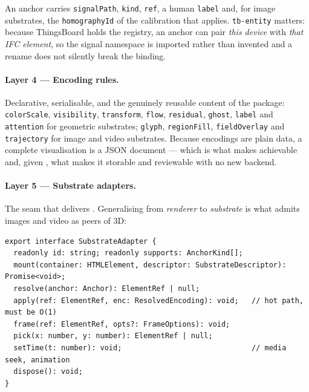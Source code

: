 An anchor carries \texttt{signalPath}, \texttt{kind}, \texttt{ref}, a human
\texttt{label} and, for image substrates, the \texttt{homographyId} of the calibration
that applies. \texttt{tb-entity} matters: because ThingsBoard holds the registry, an
anchor can pair \emph{this device} with \emph{that IFC element}, so the signal namespace
is imported rather than invented and a rename does not silently break the binding.

\paragraph{Layer 4 --- Encoding rules.} Declarative, serialisable, and the genuinely
reusable content of the package: \texttt{colorScale}, \texttt{visibility},
\texttt{transform}, \texttt{flow}, \texttt{residual}, \texttt{ghost}, \texttt{label} and
\texttt{attention} for geometric substrates; \texttt{glyph}, \texttt{regionFill},
\texttt{fieldOverlay} and \texttt{trajectory} for image and video substrates. Because
encodings are plain data, a complete visualisation is a JSON document --- which is what
makes  achievable and, given , what makes it storable and
reviewable with no new backend.

\paragraph{Layer 5 --- Substrate adapters.} The seam that delivers . Generalising
from \emph{renderer} to \emph{substrate} is what admits images and video as peers of 3D:

\begin{lstlisting}
export interface SubstrateAdapter {
  readonly id: string; readonly supports: AnchorKind[];
  mount(container: HTMLElement, descriptor: SubstrateDescriptor): Promise<void>;
  resolve(anchor: Anchor): ElementRef | null;
  apply(ref: ElementRef, enc: ResolvedEncoding): void;   // hot path, must be O(1)
  frame(ref: ElementRef, opts?: FrameOptions): void;
  pick(x: number, y: number): ElementRef | null;
  setTime(t: number): void;                              // media seek, animation
  dispose(): void;
}
\end{lstlisting}

